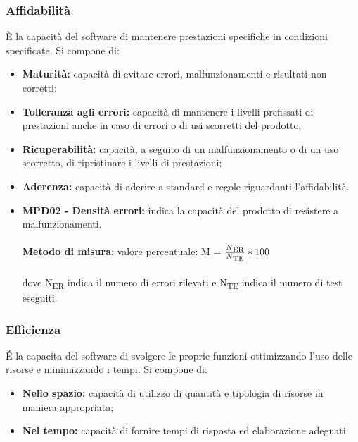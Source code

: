 \subsubsection{Affidabilità}
È la capacità del software di mantenere prestazioni specifiche in condizioni specificate.
Si compone di:
\begin{itemize}
    \item \textbf{Maturità: }capacità di evitare errori, malfunzionamenti e risultati non corretti;
    \item \textbf{Tolleranza agli errori: }capacità di mantenere i livelli prefissati di prestazioni anche in caso di errori o di usi scorretti del prodotto;
    \item \textbf{Ricuperabilità: }capacità, a seguito di un malfunzionamento o di un uso scorretto, di ripristinare i livelli di prestazioni;
    \item \textbf{Aderenza: }capacità di aderire a standard e regole riguardanti l'affidabilità.
\end{itemize}
\begin{itemize}
    \item \textbf{MPD02 - Densità errori:} indica la capacità del prodotto di resistere a malfunzionamenti.\\
    \\\textbf{Metodo di misura}: valore percentuale: M = $\frac{N\textsubscript{ER}}{N\textsubscript{TE}}*100$ \\
    \\dove N\textsubscript{ER} indica il numero di errori rilevati e N\textsubscript{TE} indica il numero di test eseguiti.
\end{itemize}
\subsubsection{Efficienza}
\'E la capacita del software di svolgere le proprie funzioni ottimizzando l'uso delle risorse e minimizzando i tempi. Si compone di:
\begin{itemize}
    \item  \textbf{Nello spazio: }capacità di utilizzo di quantità e tipologia di risorse in maniera appropriata;
    \item  \textbf{Nel tempo: }capacità di fornire tempi di risposta ed elaborazione adeguati.
\end{itemize}
